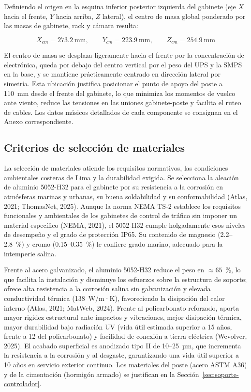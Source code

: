Definiendo el origen en la esquina inferior posterior izquierda del gabinete (eje $X$ hacia el frente, $Y$ hacia arriba, $Z$ lateral), el centro de masa global ponderado por las masas de gabinete, rack y cámara resulta:

\begin{equation}
X_{cm} = 273.2~\text{mm}, \qquad Y_{cm} = 223.9~\text{mm}, \qquad Z_{cm} = 254.9~\text{mm}
\end{equation}

El centro de masa se desplaza ligeramente hacia el frente por la concentración de electrónica, queda por debajo del centro vertical por el peso del UPS y la SMPS en la base, y se mantiene prácticamente centrado en dirección lateral por simetría. Esta ubicación justifica posicionar el punto de apoyo del poste a 110~mm desde el frente del gabinete, lo que minimiza los momentos de vuelco ante viento, reduce las tensiones en las uniones gabinete-poste y facilita el ruteo de cables. Los datos másicos detallados de cada componente se consignan en el Anexo correspondiente.

\subsection{Criterios de selección de materiales}\label{subsec:seleccion-materiales}

La selección de materiales atiende los requisitos normativos, las condiciones ambientales costeras de Lima y la durabilidad exigida. Se selecciona la aleación de aluminio 5052-H32 para el gabinete por su resistencia a la corrosión en atmósferas marinas y urbanas, su buena soldabilidad y su conformabilidad (Atlas, 2021; ThomasNet, 2025). Aunque la norma NEMA TS-2 establece los requisitos funcionales y ambientales de los gabinetes de control de tráfico sin imponer un material específico (NEMA, 2021), el 5052-H32 cumple holgadamente esos niveles de desempeño y el grado de protección IP65. Su contenido de magnesio (2.2--2.8~\%) y cromo (0.15--0.35~\%) le confiere grado marino, adecuado para la intemperie salina.

Frente al acero galvanizado, el aluminio 5052-H32 reduce el peso en $\approx 65$~\%, lo que facilita la instalación y disminuye los esfuerzos sobre la estructura de soporte; ofrece alta resistencia a la corrosión salina sin galvanización y elevada conductividad térmica (138~W/m·K), favoreciendo la disipación del calor interno (Atlas, 2021; MatWeb, 2024). Frente al policarbonato reforzado, aporta mayor rigidez estructural ante impactos y vibraciones, mejor disipación térmica, mayor durabilidad bajo radiación UV (vida útil estimada superior a 15 años, frente a 12 del policarbonato) y facilidad de conexión a tierra eléctrica (Wevolver, 2025). El acabado superficial es anodizado tipo II de 10--25~µm, que incrementa la resistencia a la corrosión y al desgaste, garantizando una vida útil superior a 10 años en servicio exterior continuo. Los materiales del poste (acero ASTM A36) y de la cimentación (hormigón armado) se justifican en la Sección~\ref{sec:soporte-controlador}.

